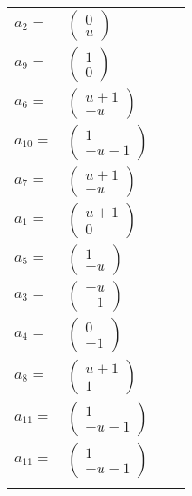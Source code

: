 \documentclass[1p]{elsarticle_modified}
\theoremstyle{definition}
\begin{document}
\begin{tabular}{m{7pt} m{180pt} m{7pt} m{180pt} }
\flushright $a_{2}=$&$\begin{pmatrix}0\\u\end{pmatrix}$ \\
\flushright $a_{9}=$&$\begin{pmatrix}1\\0\end{pmatrix}$ \\
\flushright $a_{6}=$&$\begin{pmatrix}u+1\\- u\end{pmatrix}$ \\
\flushright $a_{10}=$&$\begin{pmatrix}1\\- u-1\end{pmatrix}$ \\
\flushright $a_{7}=$&$\begin{pmatrix}u+1\\- u\end{pmatrix}$ \\
\flushright $a_{1}=$&$\begin{pmatrix}u+1\\0\end{pmatrix}$ \\
\flushright $a_{5}=$&$\begin{pmatrix}1\\- u\end{pmatrix}$ \\
\flushright $a_{3}=$&$\begin{pmatrix}- u\\-1\end{pmatrix}$ \\
\flushright $a_{4}=$&$\begin{pmatrix}0\\-1\end{pmatrix}$ \\
\flushright $a_{8}=$&$\begin{pmatrix}u+1\\1\end{pmatrix}$ \\
\flushright $a_{11}=$&$\begin{pmatrix}1\\- u-1\end{pmatrix}$\\ \flushright $a_{11}=$&$\begin{pmatrix}1\\- u-1\end{pmatrix}$\\&\end{tabular}
\end{document}
